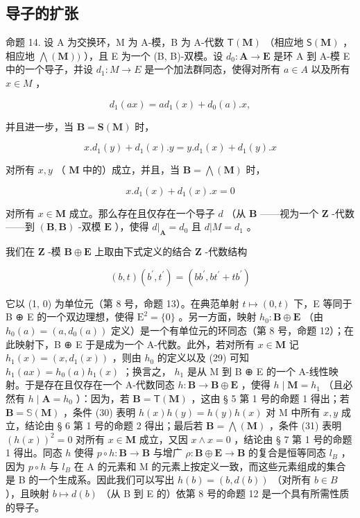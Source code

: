 \subsection{导子的扩张}

命题 14. 设 A 为交换环，M 为 A-模，B 为 A-代数 \(\mathsf{T}(\mathbf{M})\) （相应地 \(\mathsf{S}(\mathbf{M})\) ，相应地 \(\bigwedge (\mathbf{M}))\) ），且 E 为一个 (B, B)-双模。设 \(d_0: \mathbf{A} \to \mathbf{E}\) 是环 A 到 A-模 E 中的一个导子，并设 \(d_{1}:M\to E\) 是一个加法群同态，使得对所有 \(a\in A\) 以及所有 \(x\in M\) ，

\[
d _ {1} (a x) = a d _ {1} (x) + d _ {0} (a). x,\tag{29}
\]

并且进一步，当 \(\mathbf{B} = \mathbf{S}(\mathbf{M})\) 时，

\[
x. d _ {1} (y) + d _ {1} (x). y = y. d _ {1} (x) + d _ {1} (y). x\tag{30}
\]

对所有 \(x, y\) （ \(\mathbf{M}\) 中的）成立，并且，当 \(\mathbf{B} = \bigwedge (\mathbf{M})\) 时，

\[
x. d _ {1} (x) + d _ {1} (x). x = 0\tag{31}
\]

对所有 \(x \in \mathbf{M}\) 成立。那么存在且仅存在一个导子 \(d\) （从 \(\mathbf{B}\) ——视为一个 \(\mathbf{Z}\) -代数——到 \((\mathbf{B}, \mathbf{B})\) -双模 \(\mathbf{E}\) ），使得 \(d|_{\mathbf{A}} = d_0\) 且 \(d|M = d_1\) 。

我们在 \(\mathbf{Z}\) -模 \(\mathbf{B} \oplus \mathbf{E}\) 上取由下式定义的结合 \(\mathbf{Z}\) -代数结构

\[
(b, t) (b ^ {\prime}, t ^ {\prime}) = (b b ^ {\prime}, b t ^ {\prime} + t b ^ {\prime})
\]

它以 (1, 0) 为单位元（第 8 号，命题 13）。在典范单射 \(t \mapsto (0, t)\) 下，E 等同于 B ⊕ E 的一个双边理想，使得 \(\mathrm{E}^2 = \{0\}\) 。另一方面，映射 \(h_0 \colon \mathbf{B} \oplus \mathbf{E}\) （由 \(h_0(a) = (a, d_0(a))\) 定义）是一个有单位元的环同态（第 8 号，命题 12）；在此映射下，B ⊕ E 于是成为一个 A-代数。此外，若对所有 \(x \in \mathbf{M}\) 记 \(h_1(x) = (x, d_1(x))\) ，则由 \(h_0\) 的定义以及 (29) 可知 \(h_1(ax) = h_0(a)h_1(x)\) ；换言之， \(h_1\) 是从 M 到 B ⊕ E 的一个 A-线性映射。于是存在且仅存在一个 A-代数同态 \(h \colon \mathbf{B} \to \mathbf{B} \oplus \mathbf{E}\) ，使得 \(h \mid \mathbf{M} = h_1\) （且必然有 \(h \mid \mathbf{A} = h_0\) ）：因为，若 \(\mathbf{B} = \mathsf{T}(\mathbf{M})\) ，这由 § 5 第 1 号的命题 1 得出；若 \(\mathbf{B} = \mathbb{S}(\mathbf{M})\) ，条件 (30) 表明 \(h(x)h(y) = h(y)h(x)\) 对 M 中所有 \(x, y\) 成立，结论由 § 6 第 1 号的命题 2 得出；最后若 \(\mathbf{B} = \bigwedge (\mathbf{M})\) ，条件 (31) 表明 \((h(x))^2 = 0\) 对所有 \(x \in \mathbf{M}\) 成立，又因 \(x \wedge x = 0\) ，结论由 § 7 第 1 号的命题 1 得出。同态 \(h\) 使得 \(p \circ h \colon \mathbf{B} \to \mathbf{B}\) 与增广 \(\rho \colon \mathbf{B} \oplus \mathbf{E} \to \mathbf{B}\) 的复合是恒等同态 \(l_B\) ，因为 \(p \circ h\) 与 \(l_B\) 在 A 的元素和 M 的元素上按定义一致，而这些元素组成的集合是 B 的一个生成系。因此我们可以写出 \(h(b) = (b, d(b))\) （对所有 \(b \in B\) ），且映射 \(b \mapsto d(b)\) （从 B 到 E 的）依第 8 号的命题 12 是一个具有所需性质的导子。

